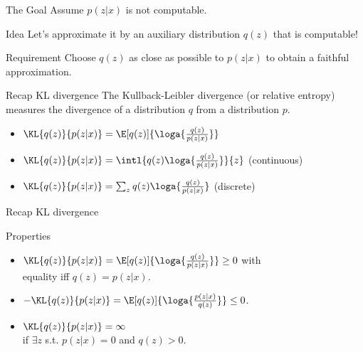 \documentclass[14pt, aspectratio=169]{beamer}
\begin{document}
\begin{frame}{The Goal}
Assume $ p(z|x) $ is not computable.
\pause
\begin{block}{Idea}
Let's approximate it by an auxiliary distribution $ q(z) $ that is computable!
\end{block}
\pause
\begin{block}{Requirement}
Choose $ q(z) $ as close as possible to $ p(z|x) $ to obtain a faithful approximation.
\end{block}
\end{frame}

\begin{frame}{Recap KL divergence}
The Kullback-Leibler divergence (or relative entropy) measures the divergence of a distribution $ q $ from 
a distribution $ p $. 
\begin{itemize}
\pause
\item $ \KL{q(z)}{p(z|x)} = \E[q(z)]{\loga{\frac{q(z)}{p(z|x)}}} $
\pause
\item $ \KL{q(z)}{p(z|x)} = \intl{ q(z) \loga{\frac{q(z)}{p(z|x)}}}{z} $ (continuous)
\pause
\item $ \KL{q(z)}{p(z|x)} = \sum_{z} q(z) \loga{\frac{q(z)}{p(z|x)}} $ (discrete)
\end{itemize}
\end{frame}


\begin{frame}{Recap KL divergence}
\begin{block}{Properties}
\begin{itemize}
\item $ \KL{q(z)}{p(z|x)} = \E[q(z)]{\loga{\frac{q(z)}{p(z|x)}}} \geq 0 $ with \\ equality iff $ q(z) = p(z|x) $.
\pause
\item $ -\KL{q(z)}{p(z|x)} = \E[q(z)]{\loga{\frac{p(z|x)}{q(z)}}} \leq 0 $.
\pause
\item $ \KL{q(z)}{p(z|x)} = \infty $ \\ if $ \exists z $ s.t. $ p(z|x) = 0 $ and $ q(z) > 0 $.
\end{itemize}
\end{block}
\end{frame}
\end{document}

